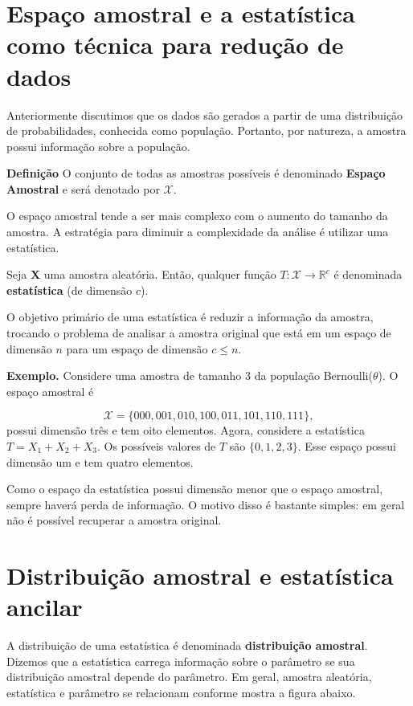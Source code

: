 \documentclass[
  letterpaper,
  DIV=11,
  numbers=noendperiod]{scrartcl}
\begin{document}
\section{Espaço amostral e a estatística como técnica para redução de
dados}\label{espauxe7o-amostral-e-a-estatuxedstica-como-tuxe9cnica-para-reduuxe7uxe3o-de-dados}

Anteriormente discutimos que os dados são gerados a partir de uma
distribuição de probabilidades, conhecida como população. Portanto, por
natureza, a amostra possui informação sobre a população.

\textbf{Definição} O conjunto de todas as amostras possíveis é
denominado \textbf{Espaço Amostral} e será denotado por \(\mathcal{X}\).

O espaço amostral tende a ser mais complexo com o aumento do tamanho da
amostra. A estratégia para diminuir a complexidade da análise é utilizar
uma estatística.

Seja \(\textbf{X}\) uma amostra aleatória. Então, qualquer função
\(T:\mathcal{X}\rightarrow \mathbb{R}^c\) é denominada
\textbf{estatística} (de dimensão \(c\)).

O objetivo primário de uma estatística é reduzir a informação da
amostra, trocando o problema de analisar a amostra original que está em
um espaço de dimensão \(n\) para um espaço de dimensão \(c\leq n\).

\textbf{Exemplo.} Considere uma amostra de tamanho 3 da população
Bernoulli(\(\theta\)). O espaço amostral é

\[\mathcal{X}=\{000,001,010,100,011,101,110,111\},\] possui dimensão
três e tem oito elementos. Agora, considere a estatística
\(T=X_1+X_2+X_3\). Os possíveis valores de \(T\) são \(\{0,1,2,3\}\).
Esse espaço possui dimensão um e tem quatro elementos.

Como o espaço da estatística possui dimensão menor que o espaço
amostral, sempre haverá perda de informação. O motivo disso é bastante
simples: em geral não é possível recuperar a amostra original.

\section{Distribuição amostral e estatística
ancilar}\label{distribuiuxe7uxe3o-amostral-e-estatuxedstica-ancilar}

A distribuição de uma estatística é denominada \textbf{distribuição
amostral}. Dizemos que a estatística carrega informação sobre o
parâmetro se sua distribuição amostral depende do parâmetro. Em geral,
amostra aleatória, estatística e parâmetro se relacionam conforme mostra
a figura abaixo.
\end{document}

